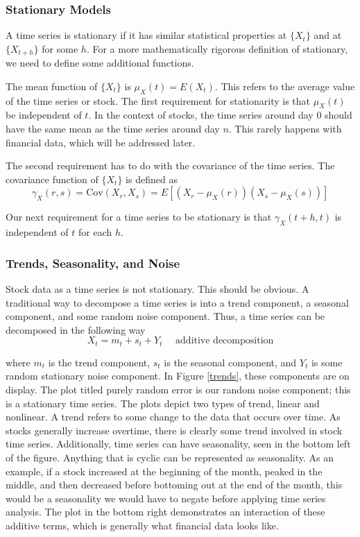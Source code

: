 \documentclass[12pt]{article}
\begin{document}
\subsubsection{Stationary Models}  
A time series is stationary if it has similar statistical properties at $\{X_t\}$ and at $\{X_{t+h}\}$ for some $h$. For a more mathematically rigorous definition of stationary, we need to define some additional functions.

The mean function of $\{X_t\}$ is $\mu_X(t) = E(X_t)$. This refers to the average value of the time series or stock. The first requirement for stationarity is that $\mu_X(t)$ be independent of $t$. In the context of stocks, the time series around day 0 should have the same mean as the time series around day $n$. This rarely happens with financial data, which will be addressed later.

The second requirement has to do with the covariance of the time series. The covariance function of $\{X_t\}$ is defined as
$$\gamma _X(r,s) = \text{Cov}(X_r, X_s) = E[(X_r - \mu _X(r))(X_s - \mu_X(s))]$$

Our next requirement for a time series to be stationary is that $\gamma_X(t+h, t)$ is independent of $t$ for each $h$. 

\subsubsection{Trends, Seasonality, and Noise}
Stock data as a time series is not stationary. This should be obvious. A traditional way to decompose a time series is into a trend component, a seasonal component, and some random noise component. Thus, a time series can be decomposed in the following way
$$X_t = m_t + s_t + Y_t \ \ \ \ \ \ \text{additive decomposition}$$

where $m_t$ is the trend component, $s_t$ is the seasonal component, and $Y_t$ is some random stationary noise component. In Figure \ref{trends}, these components are on display. The plot titled purely random error is our random noise component; this is a stationary time series. The plots depict two types of trend, linear and nonlinear. A trend refers to some change to the data that occurs over time. As stocks generally increase overtime, there is clearly some trend involved in stock time series. Additionally, time series can have seasonality, seen in the bottom left of the figure. Anything that is cyclic can be represented as seasonality. As an example, if a stock increased at the beginning of the month, peaked in the middle, and then decreased before bottoming out at the end of the month, this would be a seasonality we would have to negate before applying time series analysis. The plot in the bottom right demonstrates an interaction of these additive terms, which is generally what financial data looks like. \cite[22]{timeseries}
\end{document}
